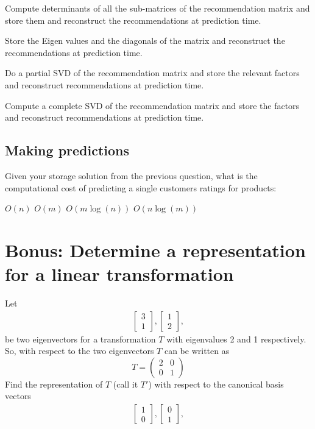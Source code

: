 \documentclass{exam}
\begin{document}
\begin{choices}
 \choice Compute determinants of all the sub-matrices of the recommendation matrix and store them and reconstruct the recommendations at prediction time.
 
 \choice Store the Eigen values and the diagonals of the matrix and reconstruct the recommendations at prediction time.
 
 \choice Do a partial SVD of the recommendation matrix and store the relevant factors and reconstruct recommendations at prediction time.
 
 \choice Compute a complete SVD  of the recommendation matrix and store the factors and reconstruct recommendations at prediction time.
\end{choices}

\subsection{Making predictions}
Given your storage solution from the previous question, what is the computational cost of predicting a single customers ratings for products:

\begin{oneparchoices}
\choice $O(n)$
\choice $O(m)$
\choice $O(m\log(n))$
\choice $O(n\log(m))$
\end{oneparchoices}


\section{Bonus: Determine a representation for a linear transformation}
Let 
\begin{eqnarray}
\left[ \begin{array}{c} 3 \\ 1 \end{array} \right],
\left[ \begin{array}{c} 1 \\ 2 \end{array} \right],
\end{eqnarray}
be two eigenvectors for a transformation $T$ with eigenvalues 2 and 1 respectively. So, with respect to the two eigenvectors $T$ can be written as
\[
  T =
\left( {\begin{array}{cccc}
   2 & 0 \\
   0 & 1
  \end{array} } \right)
\]
Find the representation of $T$ (call it $T'$) with respect to the canonical basis vectors
\begin{eqnarray}
\left[ \begin{array}{c} 1 \\ 0 \end{array} \right],
\left[ \begin{array}{c} 0 \\ 1 \end{array} \right],
\end{eqnarray}
\end{document}
